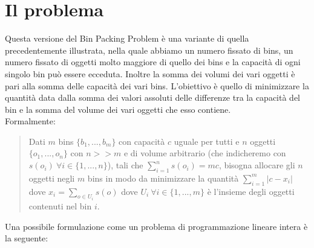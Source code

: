 \section{Il problema}
Questa versione del Bin Packing Problem è una variante di quella precedentemente illustrata, nella quale abbiamo un numero
fissato di bins, un numero fissato di oggetti molto maggiore di quello dei bins e la capacità di ogni singolo bin può essere ecceduta.
Inoltre la somma dei volumi dei vari oggetti è pari alla somma delle capacità dei vari bins.
L'obiettivo è quello di minimizzare la quantità data dalla somma dei valori assoluti delle differenze tra la capacità del bin e la somma del
volume dei vari oggetti che esso contiene. \\
Formalmente:
\begin{quote}
	Dati $ m $ bins $ \{b_1, ..., b_m\} $ con capacità $ c $ uguale per tutti e $ n $ oggetti $ \{o_1, ..., o_n\} $ con $ n >> m $ e di volume
	arbitrario (che indicheremo con $ s(o_i) \: \forall i \in \{1, ..., n\} $), tali che $ \displaystyle\sum\limits_{i=1}^{n} s(o_i) = mc $,
	bisogna allocare gli $ n $ oggetti negli $ m $ bins in modo da minimizzare la quantità $ \displaystyle\sum\limits_{i=1}^{m} |c - x_i| $
	dove $ x_i = \displaystyle\sum\limits_{o \in U_i} s(o) $ dove $ U_i \: \forall i \in \{1, ..., m\} $ è l'insieme degli oggetti
	contenuti nel bin $ i $.
\end{quote}
Una possibile formulazione come un problema di programmazione lineare intera è la seguente:

